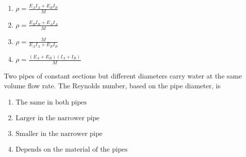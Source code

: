 \begin{figure}[h] %
    \centering
    \caption{}
    \label{fig:9}
\end{figure}
\begin{multicols}{4}
    \begin{enumerate}
        \item $ \rho = \frac{E_A I_A + E_B I_B}{M} $
        \item $ \rho = \frac{E_B I_B + E_A I_A}{M} $
        \item $ \rho = \frac{M}{E_A I_A + E_B I_B} $
        \item $ \rho = \frac{(E_A + E_B)(I_A + I_B)}{M} $
    \end{enumerate}
\end{multicols}
\bigskip
\item Two pipes of constant sections but different diameters carry water at the same volume flow rate. The Reynolds number, based on the pipe diameter, is
\begin{multicols}{2}
    \begin{enumerate}
        \item $ \text{The same in both pipes} $
        \item $ \text{Larger in the narrower pipe} $
        \item $ \text{Smaller in the narrower pipe} $
        \item $ \text{Depends on the material of the pipes} $
    \end{enumerate}
\end{multicols}
